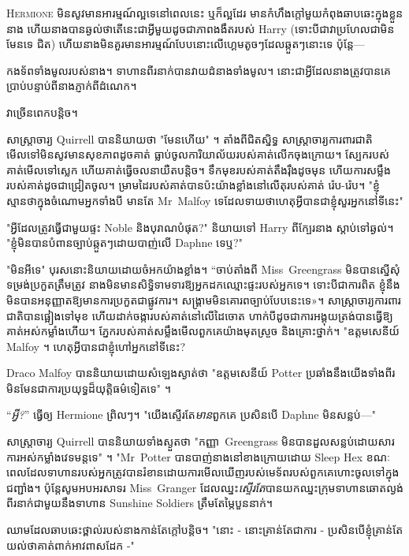 
\lettrine{H}{ermione} មិន​សូវ​មាន​អារម្មណ៍​ល្អ​ទេ​នៅ​ពេល​នេះ ឬ​ក៏​ល្អ​ដែរ មាន​កំហឹង​ក្តៅ​មួយ​កំពុង​ឆាបឆេះ​ក្នុង​ខ្លួន​នាង ហើយ​នាង​បាន​ឆ្ងល់​ថា​តើ​នេះ​ជា​អ្វី​មួយ​ដូច​ជា​ភាព​ងងឹត​របស់ Harry (ទោះ​បី​ជា​វា​ប្រហែល​ជា​មិន​មែន​ទេ ជិត) ហើយនាងមិនគួរមានអារម្មណ៍បែបនោះលើហ្គេមតូចៗដែលឆ្កួតៗនោះទេ ប៉ុន្តែ—

កងទ័ពទាំងមូលរបស់នាង។ ទាហានពីរនាក់បានវាយដំនាងទាំងមូល។ នោះ​ជា​អ្វី​ដែល​នាង​ត្រូវ​បាន​គេ​ប្រាប់​បន្ទាប់​ពី​នាង​ភ្ញាក់​ពី​ដំណេក។

វាច្រើនពេកបន្តិច។

សាស្រ្តាចារ្យ Quirrell បាននិយាយថា "មែនហើយ" ។ តាំងពីជិតស្និទ្ធ សាស្ត្រាចារ្យការពារជាតិ មើលទៅមិនសូវមានសុខភាពដូចគាត់ ធ្លាប់ចូលការិយាល័យរបស់គាត់លើកចុងក្រោយ។ ស្បែក​របស់​គាត់​មើល​ទៅ​ស្លេក ហើយ​គាត់​ធ្វើ​ចលនា​យឺត​បន្តិច។ ទឹកមុខរបស់គាត់តឹងរ៉ឹងដូចមុន ហើយការសម្លឹងរបស់គាត់ដូចជាជ្រៀតចូល។ ម្រាមដៃរបស់គាត់បានប៉ះយ៉ាងខ្លាំងនៅលើតុរបស់គាត់ រ៉េប-រ៉េប។ "ខ្ញុំស្មានថាក្នុងចំណោមអ្នកទាំងបី មានតែ Mr~Malfoy ទេដែលទាយថាហេតុអ្វីបានជាខ្ញុំសួរអ្នកនៅទីនេះ"

"អ្វីដែលត្រូវធ្វើជាមួយផ្ទះ Noble និងបុរាណបំផុត?" និយាយទៅ Harry ពីក្បែរនាង ស្តាប់ទៅឆ្ងល់។ "ខ្ញុំមិនបានបំពានច្បាប់ឆ្កួតៗដោយបាញ់លើ Daphne ទេឬ?"

"មិនអីទេ" បុរសនោះនិយាយដោយចំអកយ៉ាងខ្លាំង។ “ចាប់តាំងពី Miss~Greengrass មិនបានស្នើសុំទម្រង់ប្រកួតត្រឹមត្រូវ នាងមិនមានសិទ្ធិទាមទារឱ្យអ្នកដកឈ្មោះផ្ទះរបស់អ្នកទេ។ ទោះបី​ជា​ការ​ពិត ខ្ញុំ​នឹង​មិន​បាន​អនុញ្ញាត​ឱ្យ​មាន​ការ​ប្រកួត​ជា​ផ្លូវ​ការ​។ សង្គ្រាមមិនគោរពច្បាប់បែបនេះទេ»។ សាស្ត្រាចារ្យ​ការពារ​ជាតិ​បាន​ផ្អៀង​ទៅ​មុខ ហើយ​ដាក់​ចង្កា​របស់​គាត់​នៅ​លើ​ដៃ​ចោត ហាក់​បី​ដូច​ជា​ការ​អង្គុយ​ត្រង់​បាន​ធ្វើ​ឱ្យ​គាត់​អស់កម្លាំង​ហើយ។ ភ្នែករបស់គាត់សម្លឹងមើលពួកគេយ៉ាងមុតស្រួច និងគ្រោះថ្នាក់។ "ឧត្តមសេនីយ៍ Malfoy ។ ហេតុអ្វីបានជាខ្ញុំហៅអ្នកនៅទីនេះ?

Draco Malfoy បាននិយាយដោយសំឡេងស្ងាត់ថា "ឧត្តមសេនីយ៍ Potter ប្រឆាំងនឹងយើងទាំងពីរមិនមែនជាការប្រយុទ្ធដ៏យុត្តិធម៌ទៀតទេ" ។

“\emph{អ្វី?}” ធ្វើឲ្យ Hermione ព្រិលៗ។ "យើងស្ទើរតែ\emph{មាន}ពួកគេ ប្រសិនបើ Daphne មិនសន្លប់—"

សាស្ត្រាចារ្យ Quirrell បាននិយាយទាំងស្ងួតថា "កញ្ញា~Greengrass មិនបានដួលសន្លប់ដោយសារការអស់កម្លាំងវេទមន្តទេ" ។ "Mr~Potter បានបាញ់នាងនៅខាងក្រោយដោយ Sleep Hex ខណៈពេលដែលទាហានរបស់អ្នកត្រូវបានរំខានដោយការមើលឃើញរបស់មេទ័ពរបស់ពួកគេហោះចូលទៅក្នុងជញ្ជាំង។ ប៉ុន្តែសូមអបអរសាទរ Miss~Granger ដែលឈ្នះ\emph{ស្ទើរតែ}បានយកឈ្នះក្រុមទាហានឆោតល្ងង់ពីរនាក់ជាមួយនឹងទាហាន Sunshine Soldiers ត្រឹមតែម្ភៃបួននាក់។

ឈាមដែលឆាបឆេះថ្ពាល់របស់នាងកាន់តែក្តៅបន្តិច។ "នោះ - នោះគ្រាន់តែជាការ - ប្រសិនបើខ្ញុំគ្រាន់តែយល់ថាគាត់ពាក់អាវពាសដែក -"

